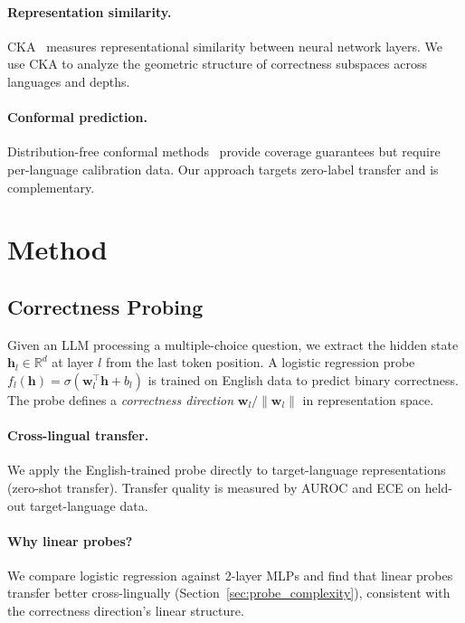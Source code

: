 \documentclass[11pt,a4paper]{article}
\begin{document}
\paragraph{Representation similarity.}
CKA~\citep{kornblith2019similarity} measures representational similarity between neural network layers.
We use CKA to analyze the geometric structure of correctness subspaces across languages and depths.

\paragraph{Conformal prediction.}
Distribution-free conformal methods~\citep{angelopoulos2023conformal} provide coverage guarantees but require per-language calibration data.
Our approach targets zero-label transfer and is complementary.


\section{Method}

\subsection{Correctness Probing}

Given an LLM processing a multiple-choice question, we extract the hidden state $\mathbf{h}_l \in \mathbb{R}^d$ at layer $l$ from the last token position.
A logistic regression probe $f_l(\mathbf{h}) = \sigma(\mathbf{w}_l^\top \mathbf{h} + b_l)$ is trained on English data to predict binary correctness.
The probe defines a \emph{correctness direction} $\mathbf{w}_l / \|\mathbf{w}_l\|$ in representation space.

\paragraph{Cross-lingual transfer.}
We apply the English-trained probe directly to target-language representations (zero-shot transfer).
Transfer quality is measured by AUROC and ECE on held-out target-language data.

\paragraph{Why linear probes?}
We compare logistic regression against 2-layer MLPs and find that linear probes transfer better cross-lingually (Section~\ref{sec:probe_complexity}), consistent with the correctness direction's linear structure.
\end{document}
